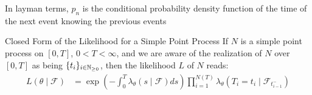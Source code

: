 \begin{remarque}
In layman terms, $p_n$ is the conditional probability density function of the time of the next event knowing the previous events
\end{remarque}


\begin{theoreme}[label = theoreme_expression_ln_lik]{Closed Form of the Likelihood for a Simple Point Process}
If $N$ is a simple point process on $[0,T]$,  $0 < T < \infty$, and we are aware of the realization of $N$ over $[0,T]$ as being $\{ t_i \}_{ i \in \mathbb{N}_{\geq 0}}$, then the likelihood $L$ of $N$ reads:
\begin{align}
L( \theta \mid \mathcal F ) &= \exp \left ( - \int_{0}^{T} \lambda_{\theta} ( s \mid \mathcal F ) ds \right )  \prod_{i=1}^{N(T)}  \lambda_{\theta} ( T_i = t_i \mid \mathcal F_{t_{i-1}^-} )  
\end{align}
\end{theoreme}


